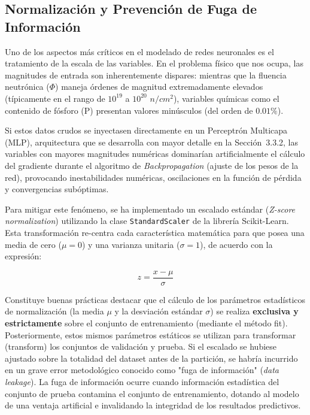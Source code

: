 \documentclass[a4paper, 12pt, twocolumn]{book}
\begin{document}
\subsection{Normalización y Prevención de Fuga de Información}

Uno de los aspectos más críticos en el modelado de redes neuronales es el tratamiento de la escala de las variables. En el problema físico que nos ocupa, las magnitudes de entrada son inherentemente dispares: mientras que la fluencia neutrónica ($\Phi$) maneja órdenes de magnitud extremadamente elevados (típicamente en el rango de $10^{19}$ a $10^{20}$ $n/cm^2$), variables químicas como el contenido de fósforo (P) presentan valores minúsculos (del orden de $0.01\%$). 

Si estos datos crudos se inyectasen directamente en un Perceptrón Multicapa (MLP), arquitectura que se desarrolla con mayor detalle en la Sección~3.3.2, las variables con mayores magnitudes numéricas dominarían artificialmente el cálculo del gradiente durante el algoritmo de \textit{Backpropagation} (ajuste de los pesos de la red), provocando inestabilidades numéricas, oscilaciones en la función de pérdida y convergencias subóptimas.

Para mitigar este fenómeno, se ha implementado un escalado estándar (\textit{Z-score normalization}) utilizando la clase \texttt{StandardScaler} de la librería Scikit-Learn. Esta transformación re-centra cada característica matemática para que posea una media de cero ($\mu = 0$) y una varianza unitaria ($\sigma = 1$), de acuerdo con la expresión:

\begin{equation}
    z = \frac{x - \mu}{\sigma}
\end{equation}

Constituye buenas prácticas destacar que el cálculo de los parámetros estadísticos de normalización (la media $\mu$ y la desviación estándar $\sigma$) se realiza \textbf{exclusiva y estrictamente} sobre el conjunto de entrenamiento (mediante el método fit). Posteriormente, estos mismos parámetros estáticos se utilizan para transformar (transform) los conjuntos de validación y prueba. Si el escalado se hubiese ajustado sobre la totalidad del dataset antes de la partición, se habría incurrido en un grave error metodológico conocido como "fuga de información" (\textit{data leakage}). La fuga de información ocurre cuando información estadística del conjunto de prueba contamina el conjunto de entrenamiento, dotando al modelo de una ventaja artificial e invalidando la integridad de los resultados predictivos.
\end{document}
